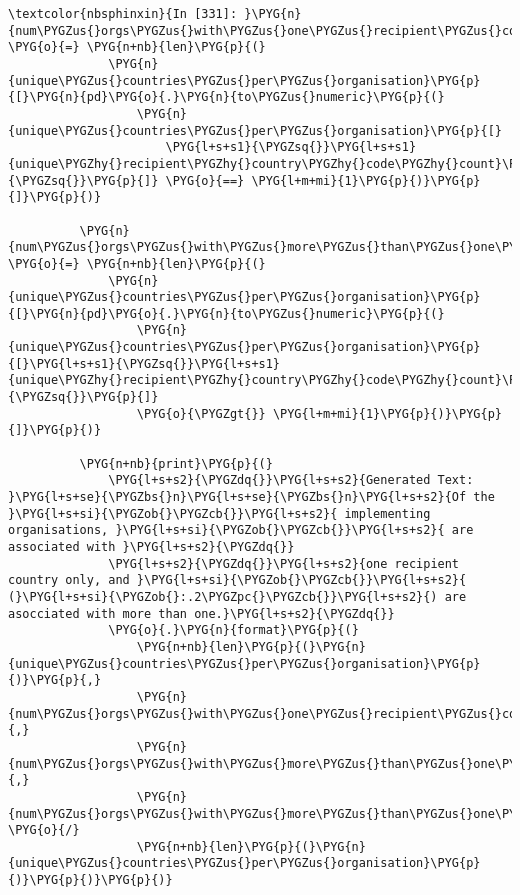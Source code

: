 \documentclass[letterpaper,10pt,english]{sphinxmanual}
\begin{document}
\begin{Verbatim}[commandchars=\\\{\}]
\textcolor{nbsphinxin}{In [331]: }\PYG{n}{num\PYGZus{}orgs\PYGZus{}with\PYGZus{}one\PYGZus{}recipient\PYGZus{}country} \PYG{o}{=} \PYG{n+nb}{len}\PYG{p}{(}
              \PYG{n}{unique\PYGZus{}countries\PYGZus{}per\PYGZus{}organisation}\PYG{p}{[}\PYG{n}{pd}\PYG{o}{.}\PYG{n}{to\PYGZus{}numeric}\PYG{p}{(}
                  \PYG{n}{unique\PYGZus{}countries\PYGZus{}per\PYGZus{}organisation}\PYG{p}{[}
                      \PYG{l+s+s1}{\PYGZsq{}}\PYG{l+s+s1}{unique\PYGZhy{}recipient\PYGZhy{}country\PYGZhy{}code\PYGZhy{}count}\PYG{l+s+s1}{\PYGZsq{}}\PYG{p}{]} \PYG{o}{==} \PYG{l+m+mi}{1}\PYG{p}{)}\PYG{p}{]}\PYG{p}{)}
          
          \PYG{n}{num\PYGZus{}orgs\PYGZus{}with\PYGZus{}more\PYGZus{}than\PYGZus{}one\PYGZus{}recipient\PYGZus{}country} \PYG{o}{=} \PYG{n+nb}{len}\PYG{p}{(}
              \PYG{n}{unique\PYGZus{}countries\PYGZus{}per\PYGZus{}organisation}\PYG{p}{[}\PYG{n}{pd}\PYG{o}{.}\PYG{n}{to\PYGZus{}numeric}\PYG{p}{(}
                  \PYG{n}{unique\PYGZus{}countries\PYGZus{}per\PYGZus{}organisation}\PYG{p}{[}\PYG{l+s+s1}{\PYGZsq{}}\PYG{l+s+s1}{unique\PYGZhy{}recipient\PYGZhy{}country\PYGZhy{}code\PYGZhy{}count}\PYG{l+s+s1}{\PYGZsq{}}\PYG{p}{]}
                  \PYG{o}{\PYGZgt{}} \PYG{l+m+mi}{1}\PYG{p}{)}\PYG{p}{]}\PYG{p}{)}
          
          \PYG{n+nb}{print}\PYG{p}{(}
              \PYG{l+s+s2}{\PYGZdq{}}\PYG{l+s+s2}{Generated Text: }\PYG{l+s+se}{\PYGZbs{}n}\PYG{l+s+se}{\PYGZbs{}n}\PYG{l+s+s2}{Of the }\PYG{l+s+si}{\PYGZob{}\PYGZcb{}}\PYG{l+s+s2}{ implementing organisations, }\PYG{l+s+si}{\PYGZob{}\PYGZcb{}}\PYG{l+s+s2}{ are associated with }\PYG{l+s+s2}{\PYGZdq{}}
              \PYG{l+s+s2}{\PYGZdq{}}\PYG{l+s+s2}{one recipient country only, and }\PYG{l+s+si}{\PYGZob{}\PYGZcb{}}\PYG{l+s+s2}{ (}\PYG{l+s+si}{\PYGZob{}:.2\PYGZpc{}\PYGZcb{}}\PYG{l+s+s2}{) are asocciated with more than one.}\PYG{l+s+s2}{\PYGZdq{}}
              \PYG{o}{.}\PYG{n}{format}\PYG{p}{(}
                  \PYG{n+nb}{len}\PYG{p}{(}\PYG{n}{unique\PYGZus{}countries\PYGZus{}per\PYGZus{}organisation}\PYG{p}{)}\PYG{p}{,}
                  \PYG{n}{num\PYGZus{}orgs\PYGZus{}with\PYGZus{}one\PYGZus{}recipient\PYGZus{}country}\PYG{p}{,}
                  \PYG{n}{num\PYGZus{}orgs\PYGZus{}with\PYGZus{}more\PYGZus{}than\PYGZus{}one\PYGZus{}recipient\PYGZus{}country}\PYG{p}{,}
                  \PYG{n}{num\PYGZus{}orgs\PYGZus{}with\PYGZus{}more\PYGZus{}than\PYGZus{}one\PYGZus{}recipient\PYGZus{}country} \PYG{o}{/}
                  \PYG{n+nb}{len}\PYG{p}{(}\PYG{n}{unique\PYGZus{}countries\PYGZus{}per\PYGZus{}organisation}\PYG{p}{)}\PYG{p}{)}\PYG{p}{)}
\end{Verbatim}
\end{document}

